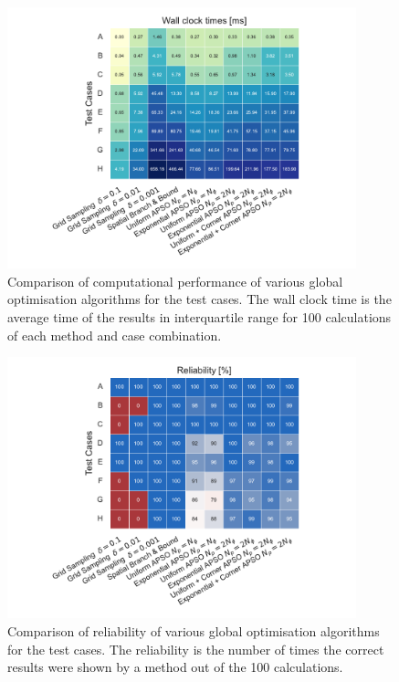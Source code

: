 \begin{figure}[ht!]
     \centering
     \includegraphics[width=0.9\textwidth]{figures/chapter-6/time.pdf}
     \caption[Comparison of computational performance of different global optimisation algorithms.]{Comparison of computational performance of various global optimisation algorithms for the test cases. The wall clock time is the average time of the results in interquartile range for 100 calculations of each method and case combination.}
     \label{fig:res_time}
 \end{figure}

\begin{figure}[ht!]
         \centering
         \includegraphics[width=0.9\textwidth]{figures/chapter-6/reliability.pdf}
     	\caption[Comparison of reliability of different global optimisation algorithms.]{Comparison of reliability of various global optimisation algorithms for the test cases. The reliability is the number of times the correct results were shown by a method out of the 100 calculations.}
	\label{fig:res_rel}
 \end{figure}
 
